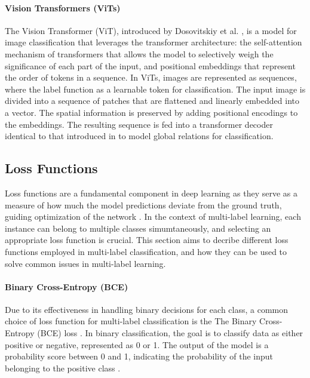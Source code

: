 \documentclass[lettersize,journal]{IEEEtran}
\begin{document}
\paragraph{Vision Transformers (ViTs)}
The Vision Transformer (ViT), introduced by Dosovitskiy et al. \cite{dosovitskiy2021imageworth16x16words}, is a model for image classification that leverages the transformer architecture: the self-attention mechanism of transformers that allows the model to selectively weigh the significance of each part of the input, and positional embeddings that represent the order of tokens in a sequence. In ViTs, images are represented as sequences, where the label function as a learnable token for classification. The input image is divided into a sequence of patches that are flattened and linearly embedded into a vector. The spatial information is preserved by adding positional encodings to the embeddings. The resulting sequence is fed into a transformer decoder identical to that introduced in \cite{vaswani2023attentionneed} to model global relations for classification.

\subsection{Loss Functions}
Loss functions are a fundamental component in deep learning as they serve as a measure of how much the model predictions deviate from the ground truth, guiding optimization of the network \cite{zhang2023dive}. In the context of multi-label learning, each instance can belong to multiple classes simumtaneously, and selecting an appropriate loss function is crucial. This section aims to decribe different loss functions employed in multi-label classification, and how they can be used to solve common issues in multi-label learning.

\paragraph{Binary Cross-Entropy (BCE)}
Due to its effectiveness in handling binary decisions for each class, a common choice of loss function for multi-label classification is the The Binary Cross-Entropy (BCE) loss \cite{mlsp,durand2019learningdeepconvnetmultilabel,nayan2024binary}. In binary classification, the goal is to classify data as either positive or negative, represented as 0 or 1. The output of the model is a probability score between 0 and 1, indicating the probability of the input belonging to the positive class \cite{nayan2024binary}.
\end{document}
